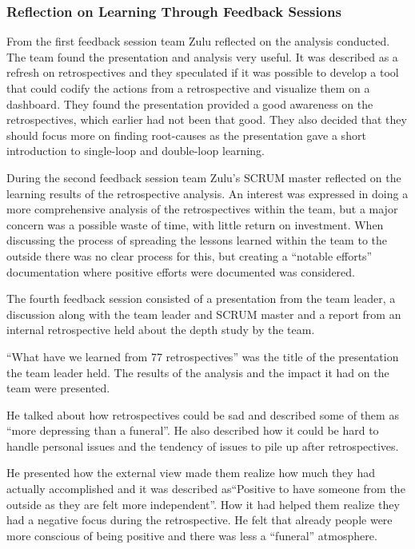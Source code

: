 \subsubsection{Reflection on Learning Through Feedback Sessions}
\label{result:learning-reflection-zulu}
From the first feedback session team Zulu reflected on the analysis conducted. The team found the presentation and analysis very useful. It was described as a refresh on retrospectives and they speculated if it was possible to develop a tool that could codify the actions from a retrospective and visualize them on a dashboard. They found the presentation provided a good awareness on the retrospectives, which earlier had not been that good. They also decided that they should focus more on finding root-causes as the presentation gave a short introduction to single-loop and double-loop learning.

During the second feedback session team Zulu's SCRUM master reflected on the learning results of the retrospective analysis. An interest was expressed in doing a more comprehensive analysis of the retrospectives within the team, but a major concern was a possible waste of time, with little return on investment. When discussing the process of spreading the lessons learned within the team to the outside there was no clear process for this, but creating a ``notable efforts'' documentation where positive efforts were documented was considered. 

The fourth feedback session consisted of a presentation from the team leader, a discussion along with the team leader and SCRUM master and a report from an internal retrospective held about the depth study by the team. 

``What have we learned from 77 retrospectives'' was the title of the presentation the team leader held. The results of the analysis and the impact it had on the team were presented. 

He talked about how retrospectives could be sad and described some of them as ``more depressing than a funeral''. He also described how it could be hard to handle personal issues and the tendency of issues to pile up after retrospectives. 

He presented how the external view made them realize how much they had actually accomplished and it was described as``Positive to have someone from the outside as they are felt more independent''. How it had helped them realize they had a negative focus during the retrospective. He felt that already people were more conscious of being positive and there was less a ``funeral'' atmosphere.  

